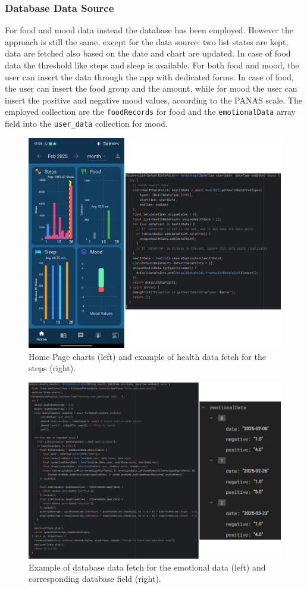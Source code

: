 \subsubsection{Database Data Source}
For food and mood data instead the database has been employed. However the approach is still the same, except for the data source: two list states are kept, data are fetched also based on the date and chart are updated. In case of food data the threshold like steps and sleep is available. For both food and mood, the user can insert the data through the app with dedicated forms. In case of food, the user can insert the food group and the amount, while for mood the user can insert the positive and negative mood values, according to the PANAS scale. The employed collection are the \texttt{foodRecords} for food and the \texttt{emotionalData} array field into the \texttt{user\_data} collection for mood.
\clearpage
\begin{figure}
    \centering
    \includegraphics[width=0.7\linewidth]{./images/homeFetch.png}
    \caption{Home Page charts (left) and example of health data fetch for the steps (right).}
\end{figure}

\begin{figure}
    \centering
    \includegraphics[width=0.7\linewidth]{./images/emotionalFetch.png}
    \caption{Example of database data fetch for the emotional data (left) and corresponding database field (right).}
\end{figure}

